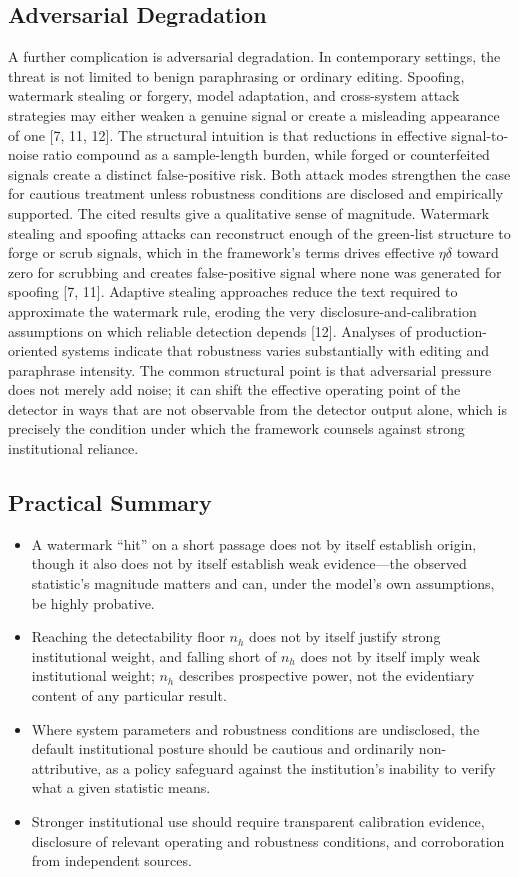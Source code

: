 \documentclass[11pt]{article}
\begin{document}
\subsection{Adversarial Degradation}
A further complication is adversarial degradation. In contemporary settings, the
threat is not limited to benign paraphrasing or ordinary editing. Spoofing,
watermark stealing or forgery, model adaptation, and cross-system attack strategies
may either weaken a genuine signal or create a misleading appearance of one
[7, 11, 12]. The structural intuition is that reductions in effective
signal-to-noise ratio compound as a sample-length burden, while forged or
counterfeited signals create a distinct false-positive risk. Both attack modes
strengthen the case for cautious treatment unless robustness conditions are disclosed
and empirically supported.
The cited results give a qualitative sense of magnitude. Watermark stealing and
spoofing attacks can reconstruct enough of the green-list structure to forge or scrub
signals, which in the framework's terms drives effective $\eta\delta$ toward zero for
scrubbing and creates false-positive signal where none was generated for spoofing
[7, 11]. Adaptive stealing approaches reduce the text required to approximate the
watermark rule, eroding the very disclosure-and-calibration assumptions on which
reliable detection depends [12]. Analyses of production-oriented systems indicate
that robustness varies substantially with editing and paraphrase intensity. The
common structural point is that adversarial pressure does not merely add noise; it
can shift the effective operating point of the detector in ways that are not
observable from the detector output alone, which is precisely the condition under
which the framework counsels against strong institutional reliance.
\subsection{Practical Summary}
\begin{itemize}[leftmargin=2em]
\item A watermark ``hit'' on a short passage does not by itself establish origin,
though it also does not by itself establish weak evidence---the observed statistic's
magnitude matters and can, under the model's own assumptions, be highly probative.
\item Reaching the detectability floor $n_h$ does not by itself justify strong
institutional weight, and falling short of $n_h$ does not by itself imply weak
institutional weight; $n_h$ describes prospective power, not the evidentiary
content of any particular result.
\item Where system parameters and robustness conditions are undisclosed, the default
institutional posture should be cautious and ordinarily non-attributive, as a
policy safeguard against the institution's inability to verify what a given
statistic means.
\item Stronger institutional use should require transparent calibration evidence,
disclosure of relevant operating and robustness conditions, and corroboration from
independent sources.
\end{itemize}
\end{document}
